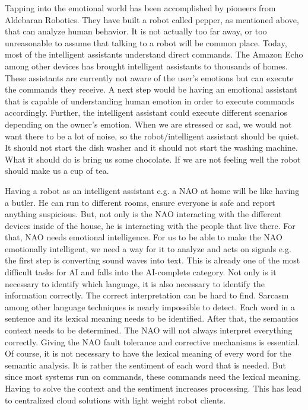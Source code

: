 \documentclass{lncs}
\begin{document}
Tapping into the emotional world has been accomplished by pioneers from Aldebaran Robotics. They have built a robot called pepper, as mentioned above, that can analyze human behavior. It is not actually too far away, or too unreasonable to assume that talking to a robot will be common place. Today, most of the intelligent assistants understand direct commands. The Amazon Echo among other devices has brought intelligent assistants to thousands of homes. These assistants are currently not aware of the user's emotions but can execute the commands they receive. A next step would be having an emotional assistant that is capable of understanding human emotion in order to execute commands accordingly.  Further, the intelligent assistant could execute different scenarios depending on the owner's emotion. When we are stressed or sad, we would not want there to be a lot of noise, so the robot/intelligent assistant should be quiet. It should not start the dish washer and it should not start the washing machine. What it should do is bring us some chocolate. If we are not feeling well the robot should make us a cup of tea.

Having a robot as an intelligent assistant e.g. a NAO at home will be like having a butler. He can run to different rooms, ensure everyone is safe and report anything suspicious. But, not only is the NAO interacting with the different devices inside of the house, he is interacting with the people that live there. For that, NAO needs emotional intelligence. For us to be able to make the NAO emotionally intelligent, we need a way for it to analyze and acts on signals e.g. the first step is converting sound waves into text. This is already one of the most difficult tasks for AI and falls into the AI-complete category. Not only is it necessary to identify which language, it is also necessary to identify the information correctly. The correct interpretation can be hard to find. Sarcasm among other language techniques is nearly impossible to detect. Each word in a sentence and its lexical meaning needs to be identified. After that, the semantics context needs to be determined. The NAO will not always interpret everything correctly. Giving the NAO fault tolerance and corrective mechanisms is essential. Of course, it is not necessary to have the lexical meaning of every word for the semantic analysis. It is rather the sentiment of each word that is needed. But since most systems run on commands, these commands need the lexical meaning. Having to solve the context and the sentiment increases processing. This has lead to centralized cloud solutions with light weight robot clients.
\end{document}
